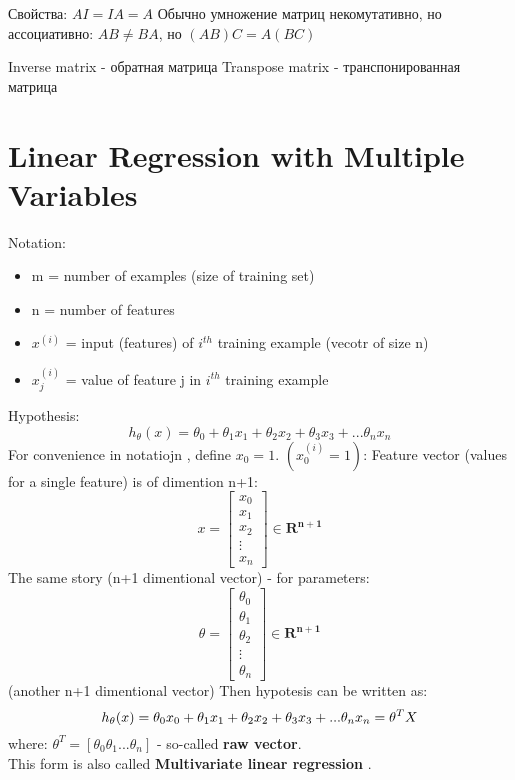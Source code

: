 \documentclass{scrartcl}
\begin{document}
Свойства: $A I = I A = A$ Обычно умножение матриц некомутативно, но
ассоциативно: $A B \neq B A$, но $(A B) C = A (B C)$

Inverse matrix - обратная матрица Transpose matrix - транспонированная
матрица

\label{Chapter 4}
\section {Linear Regression with Multiple Variables}
Notation: \\
\begin{itemize}
\item {m} = number of examples (size of training set)
\item {n} = number of features
\item{$x^{(i)}$} = input (features) of $i^{th}$ training example
  (vecotr of size n)
\item {$x_j^{(i)}$} = value of feature j in $i^{th}$ training example
\end{itemize}
Hypothesis: \\
\[
h_\theta(x) = \theta_0 + \theta_1x_1 + \theta_2x_2 + \theta_3x_3 + ...
\theta_nx_n
\]
For convenience in notatiojn , define $x_0=1$. $(x_0^{(i)}=1)$:
Feature vector (values for a single feature) is of dimention n+1:
\[
x = \left[ \begin{array}{c} x_0 \\ x_1 \\ x_2 \\ \vdots \\ x_n
  \end{array} \right] \in \mathbf{R^{n+1}}
\]
The same story (n+1 dimentional vector) - for parameters:
\[
\theta = \left[ \begin{array}{c} \theta_0 \\ \theta_1 \\ \theta_2 \\
    \vdots \\ \theta_n
  \end{array} \right] \in \mathbf{R^{n+1}}
\]
(another n+1 dimentional vector) Then hypotesis can be written as:
\[
h_\theta(x) = \theta_0x_0 + \theta_1x_1 + \theta_2x_2 + \theta_3x_3 +
... \theta_nx_n = \\ \theta^TX
\]
where: $\theta^T = [\theta_0 \theta_1 ... \theta_n]$ - so-called {\bf
  raw vector}. \\

This form is also called {\bf Multivariate linear regression }.
\end{document}
